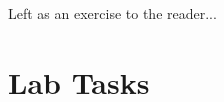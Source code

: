 \documentclass[12pt]{article}
\begin{document}
\noindent Left as an exercise to the reader...






































































\newpage
{}
\part*{\centering Lab Tasks}
\end{document}
